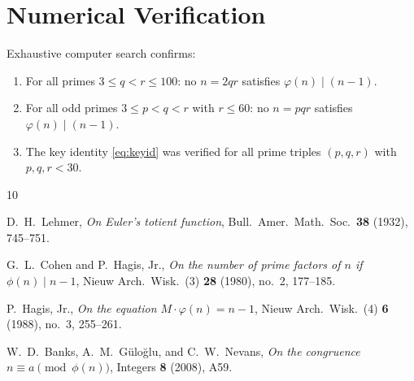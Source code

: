 \documentclass[12pt,a4paper]{amsart}
\theoremstyle{definition}
\newcommand{\euler}{\varphi}
\begin{document}
\section{Numerical Verification}

Exhaustive computer search confirms:
\begin{enumerate}
  \item For all primes $3 \le q < r \le 100$: no $n = 2qr$ satisfies
        $\euler(n) \mid (n-1)$.
  \item For all odd primes $3 \le p < q < r$ with $r \le 60$: no $n = pqr$
        satisfies $\euler(n) \mid (n-1)$.
  \item The key identity \eqref{eq:keyid} was verified for all prime triples
        $(p, q, r)$ with $p, q, r < 30$.
\end{enumerate}

\begin{thebibliography}{10}

D.~H.~Lehmer,
\emph{On Euler's totient function},
Bull.\ Amer.\ Math.\ Soc.\ \textbf{38} (1932), 745--751.

G.~L.~Cohen and P.~Hagis, Jr.,
\emph{On the number of prime factors of $n$ if $\phi(n) \mid n-1$},
Nieuw Arch.\ Wisk.\ (3) \textbf{28} (1980), no.\ 2, 177--185.

P.~Hagis, Jr.,
\emph{On the equation $M \cdot \varphi(n) = n - 1$},
Nieuw Arch.\ Wisk.\ (4) \textbf{6} (1988), no.\ 3, 255--261.

W.~D.~Banks, A.~M.~G\"{u}lo\u{g}lu, and C.~W.~Nevans,
\emph{On the congruence $n \equiv a \pmod{\phi(n)}$},
Integers \textbf{8} (2008), A59.

\end{thebibliography}
\end{document}
